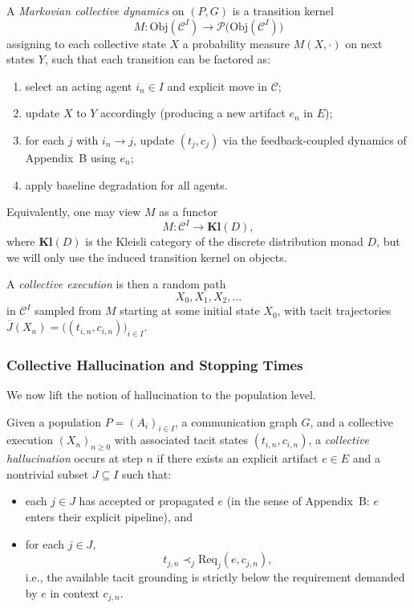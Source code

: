 \begin{definition}
A \emph{Markovian collective dynamics} on $(P,G)$ is a transition kernel
\[
  M : \mathrm{Obj}(\mathcal{C}^I) \to \mathcal{P}\bigl(\mathrm{Obj}(\mathcal{C}^I)\bigr)
\]
assigning to each collective state $X$ a probability measure $M(X,\cdot)$
on next states $Y$, such that each transition can be factored as:
\begin{enumerate}
  \item select an acting agent $i_n \in I$ and explicit move in $\mathcal{C}$;
  \item update $X$ to $Y$ accordingly (producing a new artifact $e_n$ in $E$);
  \item for each $j$ with $i_n \to j$, update $(t_j,c_j)$ via the
        feedback-coupled dynamics of Appendix~B using $e_n$;
  \item apply baseline degradation for all agents.
\end{enumerate}
Equivalently, one may view $M$ as a functor
\[
  M : \mathcal{C}^I \longrightarrow \mathbf{Kl}(D),
\]
where $\mathbf{Kl}(D)$ is the Kleisli category of the discrete distribution
monad $D$, but we will only use the induced transition kernel on objects.
\end{definition}

A \emph{collective execution} is then a random path
\[
  X_0, X_1, X_2, \dots
\]
in $\mathcal{C}^I$ sampled from $M$ starting at some initial state $X_0$,
with tacit trajectories $\overline{J}(X_n) = \bigl((t_{i,n},c_{i,n})\bigr)_{i\in I}$.

\subsubsection{Collective Hallucination and Stopping Times}

We now lift the notion of hallucination to the population level.

\begin{definition}
Given a population $P=(A_i)_{i\in I}$, a communication graph $G$, and a
collective execution $(X_n)_{n\ge 0}$ with associated tacit states
$(t_{i,n},c_{i,n})$, a \emph{collective hallucination} occurs at step $n$
if there exists an explicit artifact $e \in E$ and a nontrivial subset
$J \subseteq I$ such that:
\begin{itemize}
  \item each $j \in J$ has accepted or propagated $e$ (in the sense of
        Appendix~B: $e$ enters their explicit pipeline), and
  \item for each $j \in J$,
        \[
          t_{j,n} \prec_j \mathrm{Req}_j(e,c_{j,n}),
        \]
        i.e., the available tacit grounding is strictly below the requirement
        demanded by $e$ in context $c_{j,n}$.
\end{itemize}
\end{definition}

